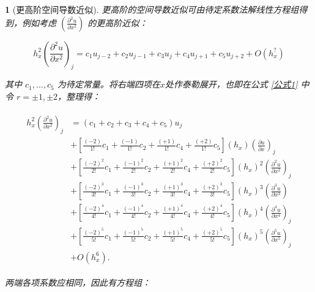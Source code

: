 \documentclass[zihao=5,UTF8]{report}
\theoremstyle{MyTheoremStyle} %
\theoremstyle{MySubsubsectionStyle} %
\newtheorem{definition}{}
\begin{document}
\begin{definition}[更高阶空间导数近似]

更高阶的空间导数近似可由待定系数法解线性方程组得到，例如考虑 $\left(\frac{\partial^2u}{\partial x^2}\right)$ 的更高阶近似：

\begin{equation}
    h_x^2\left(\frac{\partial^2u}{\partial x^2}\right)_j=c_1u_{j-2}+c_2u_{j-1}+c_3u_j+c_4u_{j+1}+c_5u_{j+2}+O(h_x^?)
\end{equation}

其中 $c_1, ...,c_5$ 为待定常量。将右端四项在$x$处作泰勒展开，也即在公式 \ref{公式1} 中令 $r = \pm 1 , \pm 2$，整理得：

\begin{align}
    \begin{aligned}
        h_x^{2}\left(\frac{\partial^{2}u}{\partial x^{2}}\right)_{j}& =(c_1+c_2+c_3+c_4+c_5)u_j  \\
        &+\left[\frac{(-2)}{1!}c_1+\frac{(-1)}{1!}c_2+\frac{(+1)}{1!}c_4+\frac{(+2)}{1!}c_5\right](h_x)\left(\frac{\partial u}{\partial x}\right)_j \\
        &+\left[\frac{(-2)^2}{2!}c_1+\frac{(-1)^2}{2!}c_2+\frac{(+1)^2}{2!}c_4+\frac{(+2)^2}{2!}c_5\right](h_x)^2\left(\frac{\partial^2u}{\partial x^2}\right)_j \\
        &+\left[\frac{(-2)^3}{3!}c_1+\frac{(-1)^3}{3!}c_2+\frac{(+1)^3}{3!}c_4+\frac{(+2)^3}{3!}c_5\right](h_x)^3\left(\frac{\partial^3u}{\partial x^3}\right) \\
        &+\left[\frac{(-2)^4}{4!}c_1+\frac{(-1)^4}{4!}c_2+\frac{(+1)^4}{4!}c_4+\frac{(+2)^4}{4!}c_5\right](h_x)^4\left(\frac{\partial^4u}{\partial x^4}\right)_j \\
        &+\left[\frac{(-2)^{5}}{5!}c_{1}+\frac{(-1)^{5}}{5!}c_{2}+\frac{(+1)^{5}}{5!}c_{4}+\frac{(+2)^{5}}{5!}c_{5}\right](h_x)^{5}\left(\frac{\partial^{5}u}{\partial x^{5}}\right)_{j} \\
        &+O(h_x^{6}).
        \end{aligned}
\end{align}

两端各项系数应相同，因此有方程组：


\end{definition}
\end{document}
